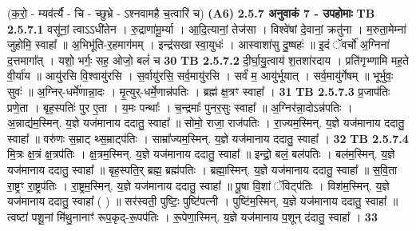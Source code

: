 \documentclass[17pt]{extarticle}
\begin{document}
                  \newline
                                    (क॒रो॒ - म्यव॑र्त्यै - चि - च्छुभ्रे - ऽश्नवामहै च॒त्वारि॑ च) \textbf{(A6)} \newline \newline
                \textbf{ 2.5.7     अनुवाकं   7 -  उपहोमाः} \newline
                                \textbf{ TB 2.5.7.1} \newline
                  वसू॑नां॒ त्वाऽऽधी॑तेन । रु॒द्राणा॑मू॒र्म्या । आ॒दि॒त्यानां॒ तेज॑सा । विश्वे॑षां दे॒वानां॒ क्रतु॑ना । म॒रुता॒मेम्ना॑ जुहोमि॒ स्वाहा᳚ ॥ अ॒भिभू॑ति-र॒हमाग॑मम् । इन्द्र॑सखा स्वा॒युधः॑ । आस्वाशा॑सु दु॒ष्षहः॑ ॥ इ॒दं ॅवर्चो॑ अ॒ग्निना॑ द॒त्तमागा᳚त् । यशो॒ भर्गः॒ सह॒ ओजो॒ बलं॑ च \textbf{ 30} \newline
                  \newline
                                \textbf{ TB 2.5.7.2} \newline
                  दी॒र्घा॒यु॒त्वाय॑ श॒तशा॑रदाय । प्रति॑गृभ्णामि मह॒ते वी॒र्या॑य ॥ आयु॑रसि वि॒श्वायु॑रसि । स॒र्वायु॑रसि॒ सर्व॒मायु॑रसि । सर्वं॑ म॒ आयु॑र्भूयात् । सर्व॒मायु॑र्गेषम् ॥ भूर्भुवः॒ सुवः॑ ॥ अ॒ग्निर्-धर्मे॑णान्ना॒दः । मृ॒त्युर्-धर्मे॒णान्न॑पतिः । ब्रह्म॑ क्ष॒त्रꣳ स्वाहा᳚ । \textbf{ 31} \newline
                  \newline
                                \textbf{ TB 2.5.7.3} \newline
                  प्र॒जाप॑तिः प्रणे॒ता । बृह॒स्पतिः॑ पुर ए॒ता । य॒मः पन्थाः᳚ । च॒न्द्रमाः᳚ पुनर॒सुः स्वाहा᳚ ॥ अ॒ग्निर॑न्ना॒दोऽन्न॑पतिः । अ॒न्नाद्य॑म॒स्मिन्. य॒ज्ञे यज॑मानाय ददातु॒ स्वाहा᳚ ॥ सोमो॒ राजा॒ राज॑पतिः । रा॒ज्यम॒स्मिन्. य॒ज्ञे यज॑मानाय ददातु॒ स्वाहा᳚ ॥ वरु॑णः स॒म्राट् थ्स॒म्राट्प॑तिः । साम्रा᳚ज्यम॒स्मिन्. य॒ज्ञे यज॑मानाय ददातु॒ स्वाहा᳚ । \textbf{ 32} \newline
                  \newline
                                \textbf{ TB 2.5.7.4} \newline
                  मि॒त्रः क्ष॒त्रं क्ष॒त्रप॑तिः । क्ष॒त्रम॒स्मिन्. य॒ज्ञे यज॑मानाय ददातु॒ स्वाहा᳚ ॥ इन्द्रो॒ बलं॒ बल॑पतिः । बल॑म॒स्मिन्. य॒ज्ञे यज॑मानाय ददातु॒ स्वाहा᳚ ॥ बृह॒स्पति॒र् ब्रह्म॒ ब्रह्म॑पतिः । ब्रह्मा॒स्मिन्. य॒ज्ञे यज॑मानाय ददातु॒ स्वाहा᳚ ॥ स॒वि॒ता रा॒ष्ट्रꣳ रा॒ष्ट्रप॑तिः । रा॒ष्ट्रम॒स्मिन्. य॒ज्ञे यज॑मानाय ददातु॒ स्वाहा᳚ ॥ पू॒षा वि॒शां ॅविट्प॑तिः । विश॑म॒स्मिन्. य॒ज्ञे यज॑मानाय ददातु॒ स्वाहा᳚ ( ) ॥ सर॑स्वती॒ पुष्टिः॒ पुष्टि॑पत्नी । पुष्टि॑म॒स्मिन्. य॒ज्ञे यज॑मानाय ददातु॒ स्वाहा᳚ ॥ त्वष्टा॑ पशू॒नां मि॑थु॒नानाꣳ॑ रूप॒कृद्-रू॒पप॑तिः । रू॒पेणा॒स्मिन्. य॒ज्ञे यज॑मानाय प॒शून् द॑दातु॒ स्वाहा᳚ । \textbf{ 33} \newline
\end{document}
